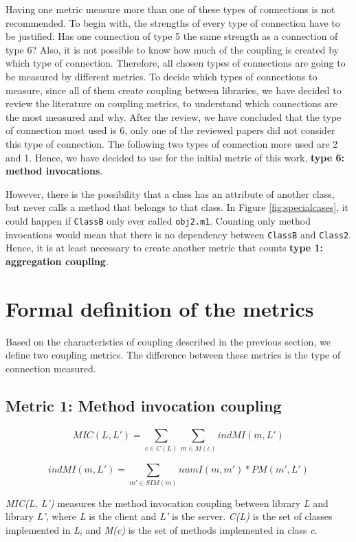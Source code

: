 \documentclass[a4paper]{article}
\begin{document}
Having one metric measure more than one of these types of connections is not recommended. To begin with, the strengths of every type of connection have to be justified: Has one connection of type 5 the same strength as a connection of type 6? Also, it is not possible to know how much of the coupling is created by which type of connection. Therefore, all chosen types of connections are going to be measured by different metrics. To decide which types of connections to measure, since all of them create coupling between libraries, we have decided to review the literature on coupling metrics, to understand which connections are the most measured and why. After the review, we have concluded that the type of connection most used is 6, only one of the reviewed papers did not consider this type of connection. The following two types of connection more used are 2 and 1. Hence, we have decided to use for the initial metric of this work, \textbf{type 6: method invocations}.

However, there is the possibility that a class has an attribute of another class, but never calls a method that belongs to that class. In Figure \ref{fig:specialcases}, it could happen if \texttt{ClassB} only ever called \texttt{obj2.m1}. Counting only method invocations would mean that there is no dependency between \texttt{ClassB} and \texttt{Class2}. Hence, it is at least necessary to create another metric that counts \textbf{type 1: aggregation coupling}.

\section{Formal definition of the metrics}
Based on the characteristics of coupling described in the previous section, we define two coupling metrics. The difference between these metrics is the type of connection measured.

\subsection{Metric 1: Method invocation coupling}
\[
  MIC(L, L') = \sum_{c \in C(L)}^{} \sum_{m \in M(c)}^{} indMI(m, L')
\]

\[
  indMI(m, L') = \sum_{m' \in SIM(m)}^{} numI(m, m')*PM(m', L')
\]

\textit{MIC(L, L')} measures the method invocation coupling between library \textit{L} and library \textit{L'}, where \textit{L} is the client and \textit{L'} is the server. \textit{C(L)} is the set of classes implemented in \textit{L}, and \textit{M(c)} is the set of methods implemented in class \textit{c}.
\end{document}
